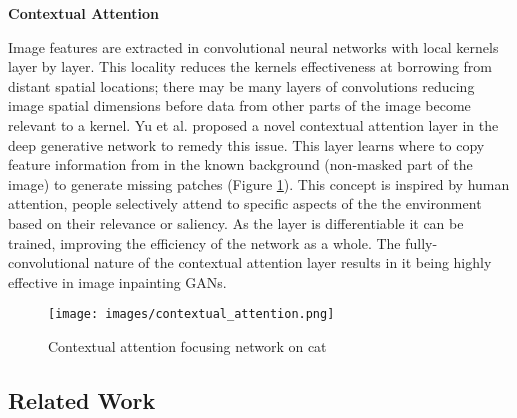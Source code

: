 \documentclass[twocolumn]{article}
\begin{document}
\textbf{Contextual Attention}

Image features are extracted in convolutional neural networks with local kernels layer by layer.
This locality reduces the kernels effectiveness at borrowing from distant spatial locations; there may be many layers of convolutions reducing image spatial dimensions before data from other parts of the image become relevant to a kernel.
Yu et al.\autocite{yuGenerativeImageInpainting2018} proposed a novel contextual attention layer in the deep generative network to remedy this issue.
This layer learns where to copy feature information from in the known background (non-masked part of the image) to generate missing patches (Figure \ref{fig:contextual_attention}).
This concept is inspired by human attention, people selectively attend to specific aspects of the the environment based on their relevance or saliency.
As the layer is differentiable it can be trained, improving the efficiency of the network as a whole.
The fully-convolutional nature of the contextual attention layer results in it being highly effective in image inpainting GANs.

\begin{figure}[htbp]
\centering
\texttt{[image: images/contextual\_attention.png]}
\caption{\label{fig:contextual_attention}Contextual attention focusing network on cat \autocite{zhangAgileAmuletRealTime2018}}
\end{figure}

\subsection{Related Work}
\label{sec:org56608ce}
\end{document}
